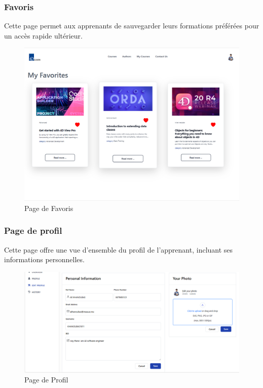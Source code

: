 \subsubsection{Favoris}

Cette page permet aux apprenants de sauvegarder leurs formations préférées pour un accès rapide ultérieur.

\begin{figure}[H]
    \centering
    \includegraphics[width=19cm]{Figures/favoris.png}
    \caption{ Page de Favoris}
\end{figure}

\subsubsection{Page de profil}
Cette page offre une vue d'ensemble du profil de l'apprenant, incluant ses informations personnelles.

\begin{figure}[H]
    \centering
    \includegraphics[width=19cm]{Figures/profil.png}
    \caption{ Page de Profil}
\end{figure}


